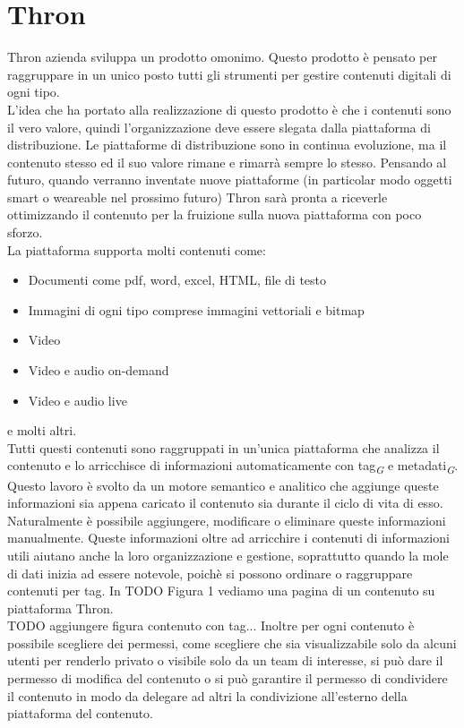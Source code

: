 \documentclass[a4paper, 12pt, twoside, openright]{book}
\newcommand{\gloss}[1]{#1\textsubscript{\textit{\tiny{G}}}}
\begin{document}
\section{Thron}
Thron azienda sviluppa un prodotto omonimo. Questo prodotto è pensato per raggruppare in un unico posto tutti gli strumenti per gestire contenuti digitali di ogni tipo.\\
L'idea che ha portato alla realizzazione di questo prodotto è che i contenuti sono il vero valore, quindi l'organizzazione deve essere slegata dalla piattaforma di distribuzione. Le piattaforme di distribuzione sono in continua evoluzione, ma il contenuto stesso ed il suo valore rimane e rimarrà sempre lo stesso. Pensando al futuro, quando verranno inventate nuove piattaforme (in particolar modo oggetti smart o weareable nel prossimo futuro) Thron sarà pronta a riceverle ottimizzando il contenuto per la fruizione sulla nuova piattaforma con poco sforzo.\\
La piattaforma supporta molti contenuti come:
\begin{itemize}
\item Documenti come pdf, word, excel, HTML, file di testo
\item Immagini di ogni tipo comprese immagini vettoriali e bitmap
\item Video
\item Video e audio on-demand
\item Video e audio live
\end{itemize}
e molti altri.\\
Tutti questi contenuti sono raggruppati in un'unica piattaforma che analizza il contenuto e lo arricchisce di informazioni automaticamente con \gloss{tag} e \gloss{metadati}. Questo lavoro è svolto da un motore semantico e analitico che aggiunge queste informazioni sia appena caricato il contenuto sia durante il ciclo di vita di esso. Naturalmente è possibile aggiungere, modificare o eliminare queste informazioni manualmente. Queste informazioni oltre ad arricchire i contenuti di informazioni utili aiutano anche la loro organizzazione e gestione, soprattutto quando la mole di dati inizia ad essere notevole, poichè si possono ordinare o raggruppare contenuti per tag. In TODO Figura 1 vediamo una pagina di un contenuto su piattaforma Thron.\\
TODO aggiungere figura contenuto con tag...
Inoltre per ogni contenuto è possibile scegliere dei permessi, come scegliere che sia visualizzabile solo da alcuni utenti per renderlo privato o visibile solo da un team di interesse, si può dare il permesso di modifica del contenuto o si può garantire il permesso di condividere il contenuto in modo da delegare ad altri la condivizione all'esterno della piattaforma del contenuto.\\ \\
\end{document}
